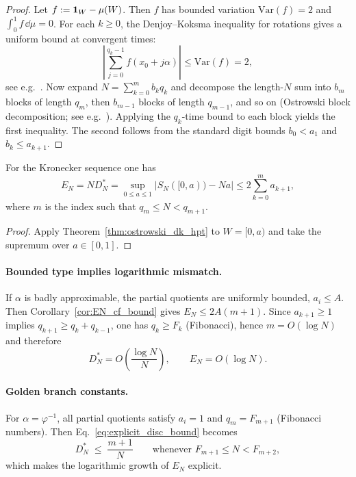 \begin{proof}
Let $f:=\mathbf{1}_W-\mu(W)$. Then $f$ has bounded variation $\mathrm{Var}(f)=2$ and $\int_0^1 f\,\dd\mu=0$.
For each $k\ge 0$, the Denjoy--Koksma inequality for rotations gives a uniform bound at convergent times:
\begin{equation}
\left|\sum_{j=0}^{q_k-1} f(x_0+j\alpha)\right|\le \mathrm{Var}(f)=2,
\end{equation}
see e.g.\ \cite{Denjoy1932,Koksma1935,KatokHasselblatt1995}.
Now expand $N=\sum_{k=0}^m b_k q_k$ and decompose the length-$N$ sum into $b_m$ blocks of length $q_m$, then $b_{m-1}$ blocks of length $q_{m-1}$, and so on (Ostrowski block decomposition; see e.g.\ \cite{AlloucheShallit2003,Lothaire2002}). Applying the $q_k$-time bound to each block yields the first inequality. The second follows from the standard digit bounds $b_0<a_1$ and $b_k\le a_{k+1}$.
\end{proof}

\begin{corollary}
\label{cor:EN_cf_bound}
For the Kronecker sequence one has
\begin{equation}
E_N = N D_N^\ast = \sup_{0\le a\le 1}\left|S_N([0,a)) - Na\right|
\le 2\sum_{k=0}^m a_{k+1},
\end{equation}
where $m$ is the index such that $q_m\le N<q_{m+1}$.
\end{corollary}

\begin{proof}
Apply Theorem~\ref{thm:ostrowski_dk_hpt} to $W=[0,a)$ and take the supremum over $a\in[0,1]$.
\end{proof}

\paragraph{Bounded type implies logarithmic mismatch.}
If $\alpha$ is badly approximable, the partial quotients are uniformly bounded, $a_i\le A$. Then Corollary~\ref{cor:EN_cf_bound} gives $E_N\le 2A(m+1)$. Since $a_{k+1}\ge 1$ implies $q_{k+1}\ge q_k+q_{k-1}$, one has $q_k\ge F_k$ (Fibonacci), hence $m=O(\log N)$ and therefore
\begin{equation}
D_N^\ast = O\!\left(\frac{\log N}{N}\right),\qquad
E_N=O(\log N).
\end{equation}

\paragraph{Golden branch constants.}
For $\alpha=\varphi^{-1}$, all partial quotients satisfy $a_i=1$ and $q_m=F_{m+1}$ (Fibonacci numbers). Then Eq.~\eqref{eq:explicit_disc_bound} becomes
\begin{equation}
D_N^\ast \;\le\; \frac{m+1}{N}\qquad\text{whenever } F_{m+1}\le N< F_{m+2},
\end{equation}
which makes the logarithmic growth of $E_N$ explicit.

